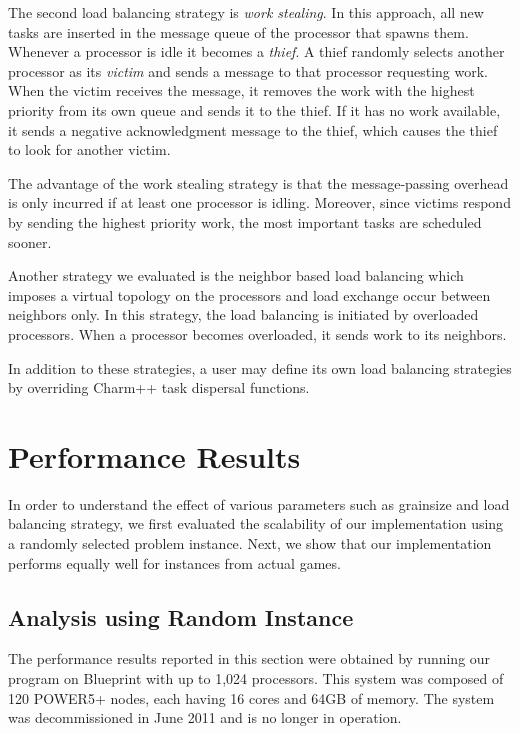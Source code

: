 \documentclass[10pt, conference, compsocconf]{IEEEtran}
\begin{document}
The second load balancing strategy is {\em work stealing}.  In this
approach, all new tasks are inserted in the message queue of the processor that
spawns them.  Whenever a processor is idle it becomes a {\em thief}.  A thief
randomly selects another processor as its {\em victim} and sends a message to
that processor requesting work.  When the victim receives the message, it
removes the work with the highest priority from its own queue and sends it to
the thief.  If it has no work available, it sends a negative acknowledgment
message to the thief, which causes the thief to look for another victim.

The advantage of the work stealing strategy is that the message-passing
overhead is only incurred if at least one processor is idling.  Moreover,
since victims respond by sending the highest priority work, the most
important tasks are scheduled sooner.  

Another strategy we evaluated is the neighbor based load balancing which imposes a virtual topology on the processors and load exchange occur between neighbors only. In this strategy, the load balancing is initiated by overloaded processors. When a processor becomes overloaded, it sends work to its neighbors. 

In addition to these strategies, a user may define its own load balancing
strategies by overriding {\sc Charm++} task dispersal functions.


\section{Performance Results}\label{Results}
In order to understand the effect of various parameters such as grainsize and
load balancing strategy, we first evaluated the scalability of our
implementation using a randomly selected problem instance. Next, we show that
our implementation performs equally well for instances from actual games.

\subsection{Analysis using Random Instance} 

The performance results reported in this section were obtained by running our
program on Blueprint with up to 1,024 processors. This system was composed of
120 POWER5+ nodes, each having 16 cores and 64GB of memory. The system was
decommissioned in June 2011 and is no longer in operation.
\end{document}
